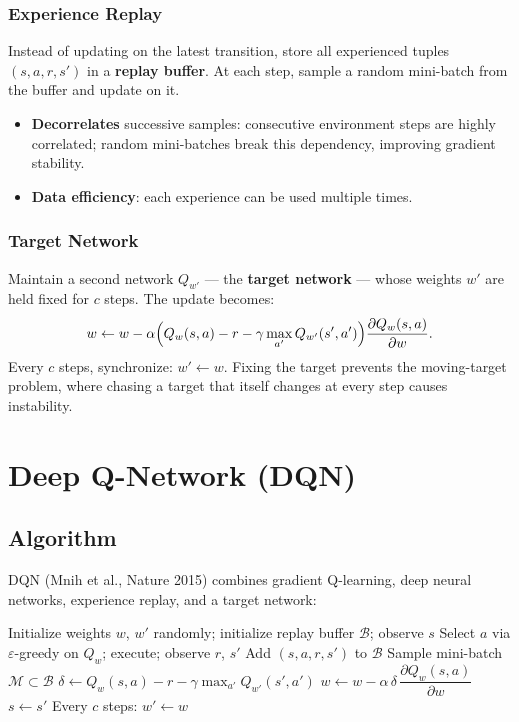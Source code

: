 \documentclass[11pt,a4paper]{article}
\theoremstyle{definition}
\theoremstyle{plain}
\theoremstyle{remark}
\begin{document}
\subsubsection{Experience Replay}

Instead of updating on the latest transition, store all experienced tuples $(s, a, r, s')$ in a \textbf{replay buffer}. At each step, sample a random mini-batch from the buffer and update on it.

\begin{itemize}
    \item \textbf{Decorrelates} successive samples: consecutive environment steps are highly correlated; random mini-batches break this dependency, improving gradient stability.
    \item \textbf{Data efficiency}: each experience can be used multiple times.
\end{itemize}

\subsubsection{Target Network}

Maintain a second network $Q_{w'}$ — the \textbf{target network} — whose weights $w'$ are held fixed for $c$ steps. The update becomes:
\[
    w \leftarrow w - \alpha\Bigl(Q_w(s,a) - r - \gamma\max_{a'}Q_{w'}(s',a')\Bigr)\frac{\partial Q_w(s,a)}{\partial w}.
\]
Every $c$ steps, synchronize: $w' \leftarrow w$. Fixing the target prevents the moving-target problem, where chasing a target that itself changes at every step causes instability.

\section{Deep Q-Network (DQN)}

\subsection{Algorithm}

DQN (Mnih et al., Nature 2015) combines gradient Q-learning, deep neural networks, experience replay, and a target network:

\begin{algorithm}
\caption{Deep Q-Network (DQN)}
\begin{algorithmic}
\STATE Initialize weights $w$, $w'$ randomly; initialize replay buffer $\mathcal{B}$; observe $s$
\LOOP
    \STATE Select $a$ via $\varepsilon$-greedy on $Q_w$; execute; observe $r$, $s'$
    \STATE Add $(s, a, r, s')$ to $\mathcal{B}$
    \STATE Sample mini-batch $\mathcal{M} \subset \mathcal{B}$
        \STATE $\delta \leftarrow Q_w(s,a) - r - \gamma\max_{a'} Q_{w'}(s',a')$
        \STATE $w \leftarrow w - \alpha\,\delta\,\dfrac{\partial Q_w(s,a)}{\partial w}$
    \ENDFOR
    \STATE $s \leftarrow s'$
    \STATE Every $c$ steps: $w' \leftarrow w$
\ENDLOOP
\end{algorithmic}
\end{algorithm}
\end{document}
